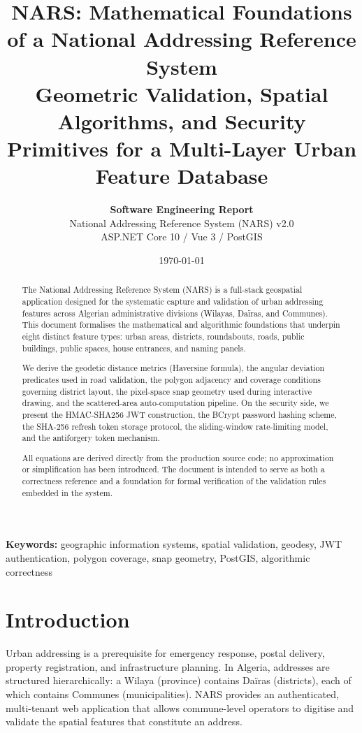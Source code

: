 \documentclass[12pt,a4paper]{article}
\title{%
  \textbf{NARS: Mathematical Foundations of a National Addressing Reference System}\\[4pt]
  \large Geometric Validation, Spatial Algorithms, and Security Primitives
  for a Multi-Layer Urban Feature Database
}
\author{%
  \textbf{Software Engineering Report} \\[4pt]
  National Addressing Reference System (NARS) v2.0 \\
  ASP.NET Core 10 / Vue 3 / PostGIS
}
\date{\today}
\theoremstyle{definition}
\theoremstyle{plain}
\theoremstyle{remark}
\begin{document}
\maketitle
\tableofcontents
\newpage

\begin{abstract}
The National Addressing Reference System (NARS) is a full-stack geospatial
application designed for the systematic capture and validation of urban
addressing features across Algerian administrative divisions (Wilayas,
Daïras, and Communes). This document formalises the mathematical and
algorithmic foundations that underpin eight distinct feature types: urban
areas, districts, roundabouts, roads, public buildings, public spaces,
house entrances, and naming panels.

We derive the geodetic distance metrics (Haversine formula), the angular
deviation predicates used in road validation, the polygon adjacency and
coverage conditions governing district layout, the pixel-space snap
geometry used during interactive drawing, and the scattered-area
auto-computation pipeline. On the security side, we present the HMAC-SHA256
JWT construction, the BCrypt password hashing scheme, the SHA-256 refresh
token storage protocol, the sliding-window rate-limiting model, and the
antiforgery token mechanism.

All equations are derived directly from the production source code; no
approximation or simplification has been introduced. The document is
intended to serve as both a correctness reference and a foundation for
formal verification of the validation rules embedded in the system.
\end{abstract}

\noindent\textbf{Keywords:} geographic information systems, spatial validation,
geodesy, JWT authentication, polygon coverage, snap geometry, PostGIS,
algorithmic correctness

\section{Introduction}
\label{sec:intro}

Urban addressing is a prerequisite for emergency response, postal delivery,
property registration, and infrastructure planning. In Algeria, addresses are
structured hierarchically: a Wilaya (province) contains Daïras (districts),
each of which contains Communes (municipalities). NARS provides an
authenticated, multi-tenant web application that allows commune-level
operators to digitise and validate the spatial features that constitute an
address.
\end{document}
